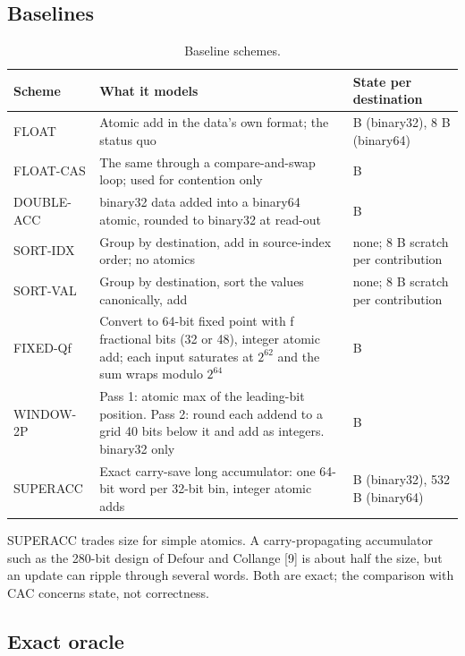 \documentclass[3p,10pt]{elsarticle}
\begin{document}
\hypertarget{baselines}{%
\subsection{Baselines}\label{baselines}}

\begin{table}[!htbp]\centering\small\setlength{\tabcolsep}{4pt}
\caption{Baseline schemes.}\label{tab:8}
\begin{tabularx}{\linewidth}{>{\raggedright\arraybackslash\hsize=0.488\hsize}X>{\raggedright\arraybackslash\hsize=1.326\hsize}X>{\raggedright\arraybackslash\hsize=1.186\hsize}X}
\toprule
Scheme & What it models & State per destination \\
\midrule
FLOAT & Atomic add in the data's own format; the status quo & 4 B (binary32), 8 B (binary64) \\
FLOAT-CAS & The same through a compare-and-swap loop; used for contention only & 4 B \\
DOUBLE-ACC & binary32 data added into a binary64 atomic, rounded to binary32 at
read-out & 8 B \\
SORT-IDX & Group by destination, add in source-index order; no atomics & none; 8 B scratch per contribution \\
SORT-VAL & Group by destination, sort the values canonically, add & none; 8 B scratch per contribution \\
FIXED-Qf & Convert to 64-bit fixed point with f fractional bits (32 or 48), integer
atomic add; each input saturates at \(2^{62}\) and the sum wraps modulo
\(2^{64}\) & 8 B \\
WINDOW-2P & Pass 1: atomic max of the leading-bit position. Pass 2: round each
addend to a grid 40 bits below it and add as integers. binary32 only & 16 B \\
SUPERACC & Exact carry-save long accumulator: one 64-bit word per 32-bit bin,
integer atomic adds & 76 B (binary32), 532 B (binary64) \\
\bottomrule
\end{tabularx}
\end{table}

SUPERACC trades size for simple atomics. A carry-propagating accumulator
such as the 280-bit design of Defour and Collange {[}9{]} is about half
the size, but an update can ripple through several words. Both are
exact; the comparison with CAC concerns state, not correctness.

\hypertarget{exact-oracle}{%
\subsection{Exact oracle}\label{exact-oracle}}
\end{document}
